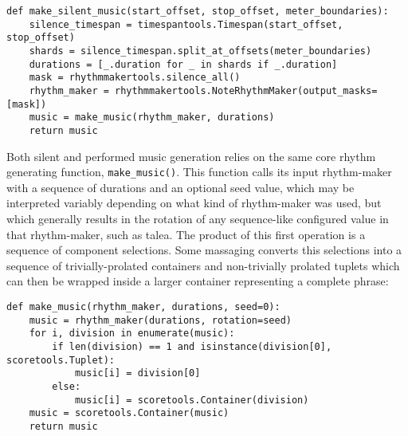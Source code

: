 \begin{abjadbookoutput}
\begin{singlespacing}
\vspace{-0.5\baselineskip}
\begin{lstlisting}
def make_silent_music(start_offset, stop_offset, meter_boundaries):
    silence_timespan = timespantools.Timespan(start_offset, stop_offset)
    shards = silence_timespan.split_at_offsets(meter_boundaries)
    durations = [_.duration for _ in shards if _.duration]
    mask = rhythmmakertools.silence_all()
    rhythm_maker = rhythmmakertools.NoteRhythmMaker(output_masks=[mask])
    music = make_music(rhythm_maker, durations)
    return music
\end{lstlisting}
\end{singlespacing}
\end{abjadbookoutput}

\noindent Both silent and performed music generation relies on the same core
rhythm generating function, \texttt{make\_music()}. This function calls its
input rhythm-maker with a sequence of durations and an optional seed value,
which may be interpreted variably depending on what kind of rhythm-maker was
used, but which generally results in the rotation of any sequence-like
configured value in that rhythm-maker, such as talea. The product of this first
operation is a sequence of component selections. Some massaging converts this
selections into a sequence of trivially-prolated containers and non-trivially
prolated tuplets which can then be wrapped inside a larger container
representing a complete phrase:

\begin{comment}
<abjadextract dissertation.py.time_tools:make_music />[strip_prompt]
\end{comment}

\begin{abjadbookoutput}
\begin{singlespacing}
\vspace{-0.5\baselineskip}
\begin{lstlisting}
def make_music(rhythm_maker, durations, seed=0):
    music = rhythm_maker(durations, rotation=seed)
    for i, division in enumerate(music):
        if len(division) == 1 and isinstance(division[0], scoretools.Tuplet):
            music[i] = division[0]
        else:
            music[i] = scoretools.Container(division)
    music = scoretools.Container(music)
    return music
\end{lstlisting}
\end{singlespacing}
\end{abjadbookoutput}

